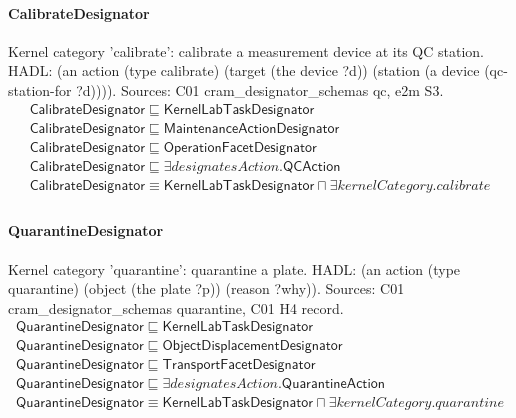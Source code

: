 \documentclass[10pt]{article}
\begin{document}
\paragraph{CalibrateDesignator} Kernel category 'calibrate': calibrate a measurement device at its QC station. HADL: (an action (type calibrate) (target (the device ?d)) (station (a device (qc-station-for ?d)))). Sources: C01 cram\_designator\_schemas qc, e2m S3.
\[\begin{array}{l}
\mathsf{CalibrateDesignator} \sqsubseteq  \mathsf{KernelLabTaskDesignator} \\
\mathsf{CalibrateDesignator} \sqsubseteq  \mathsf{MaintenanceActionDesignator} \\
\mathsf{CalibrateDesignator} \sqsubseteq  \mathsf{OperationFacetDesignator} \\
\mathsf{CalibrateDesignator} \sqsubseteq  \exists \mathit{designatesAction}.\mathsf{QCAction} \\
\mathsf{CalibrateDesignator} \equiv  \mathsf{KernelLabTaskDesignator} \sqcap  \exists \mathit{kernelCategory}.{calibrate} \\
\end{array}\]
\paragraph{QuarantineDesignator} Kernel category 'quarantine': quarantine a plate. HADL: (an action (type quarantine) (object (the plate ?p)) (reason ?why)). Sources: C01 cram\_designator\_schemas quarantine, C01 H4 record.
\[\begin{array}{l}
\mathsf{QuarantineDesignator} \sqsubseteq  \mathsf{KernelLabTaskDesignator} \\
\mathsf{QuarantineDesignator} \sqsubseteq  \mathsf{ObjectDisplacementDesignator} \\
\mathsf{QuarantineDesignator} \sqsubseteq  \mathsf{TransportFacetDesignator} \\
\mathsf{QuarantineDesignator} \sqsubseteq  \exists \mathit{designatesAction}.\mathsf{QuarantineAction} \\
\mathsf{QuarantineDesignator} \equiv  \mathsf{KernelLabTaskDesignator} \sqcap  \exists \mathit{kernelCategory}.{quarantine} \\
\end{array}\]
\end{document}
